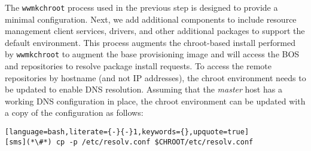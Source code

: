 The \texttt{wwmkchroot} process used in the previous step is designed to
provide a minimal \baseOS{} configuration. Next, we add additional components
to include resource management client services, \InfiniBand{} drivers, and
other additional packages to support the default \OHPC{} environment. This
process augments the chroot-based install performed by \texttt{wwmkchroot} to
augment the base provisioning image and will access the BOS and \OHPC{}
repositories to resolve package install requests. To access the remote
repositories by hostname (and not IP addresses), the chroot environment needs
to be updated to enable DNS resolution. Assuming that the {\em master} host has
a working DNS configuration in place, the chroot environment can be updated
with a copy of the configuration as follows:

\begin{lstlisting}[language=bash,literate={-}{-}1,keywords={},upquote=true]
[sms](*\#*) cp -p /etc/resolv.conf $CHROOT/etc/resolv.conf
\end{lstlisting}
